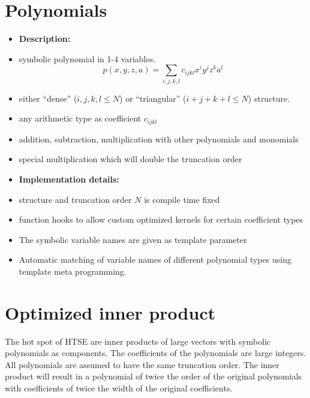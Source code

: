 \documentclass[oribibl]{llncs2e/llncs}
\begin{document}
\section{Polynomials}
\begin{itemize}
\item {\bf Description:}
\item symbolic polynomial in 1-4 variables.
\begin{equation}
    p(x,y,z,a) = \sum_{i,j,k,l} c_{ijkl} x^i y^j z^k a^l
\end{equation}
\item either ``dense'' (${i,j,k,l} \le N$) or ``triangular'' ($i+j+k+l \le N$) structure.
\item any arithmetic type as coefficient $c_{ijkl}$
\item addition, subtraction, multiplication with other polynomials and monomials
\item special multiplication which will double the truncation order
\item {\bf Implementation details:}
\item structure and truncation order $N$ is compile time fixed 
\item function hooks to allow custom optimized kernels for certain coefficient types
\item The symbolic variable names are given as template parameter
\item Automatic matching of variable names of different polynomial types using template meta programming.
\end{itemize}

\section{Optimized inner product}
The hot spot of HTSE are inner products of large vectors with symbolic polynomials as components. The coefficients of the polynomials are large integers.
All polynomials are assumed to have the same truncation order.
The inner product will result in a polynomial of twice the order of the original polynomials
with coefficients of twice the width of the original coefficients.
\end{document}
